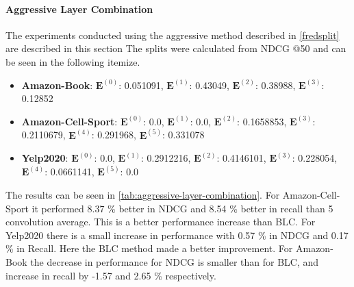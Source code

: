 \paragraph{Aggressive Layer Combination}
The experiments conducted using the aggressive method described in \autoref{fredsplit} are described in this section
The splits were calculated from NDCG @50 and can be seen in the following itemize.
\begin{itemize}
    \item \textbf{Amazon-Book}: $\mathbf{E}^{(0)}$: 0.051091, $\mathbf{E}^{(1)}$: 0.43049, $\mathbf{E}^{(2)}$: 0.38988, $\mathbf{E}^{(3)}$:  0.12852
    \item \textbf{Amazon-Cell-Sport}: $\mathbf{E}^{(0)}$: 0.0, $\mathbf{E}^{(1)}$: 0.0, $\mathbf{E}^{(2)}$: 0.1658853, $\mathbf{E}^{(3)}$:  0.2110679, $\mathbf{E}^{(4)}$: 0.291968, $\mathbf{E}^{(5)}$: 0.331078
    \item \textbf{Yelp2020}: $\mathbf{E}^{(0)}$: 0.0, $\mathbf{E}^{(1)}$: 0.2912216, $\mathbf{E}^{(2)}$: 0.4146101, $\mathbf{E}^{(3)}$: 0.228054, $\mathbf{E}^{(4)}$: 0.0661141, $\mathbf{E}^{(5)}$: 0.0
\end{itemize}
The results can be seen in \autoref{tab:aggressive-layer-combination}.
For Amazon-Cell-Sport it performed 8.37 \% better in NDCG and 8.54 \% better in recall than 5 convolution average.
This is a better performance increase than BLC.
For Yelp2020 there is a small increase in performance with 0.57 \% in NDCG and 0.17 \% in Recall.
Here the BLC method made a better improvement.
For Amazon-Book the decrease in performance for NDCG is smaller than for BLC, and increase in recall by -1.57 and 2.65 \% respectively.

